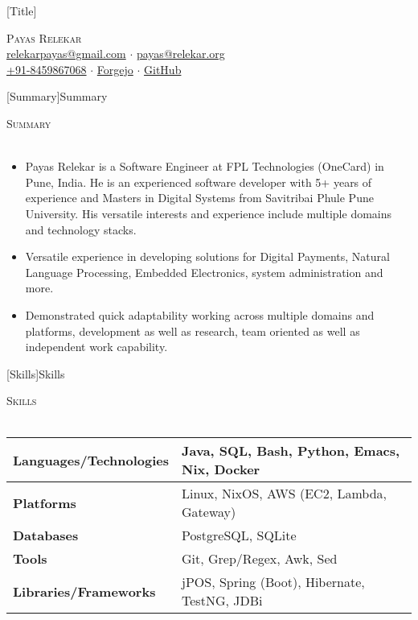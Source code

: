 \documentclass[a4paper]{article}
\newcommand{\lineunder} {
    \vspace*{-8pt} \\
    \hspace*{-18pt} \hrulefill \\
}
\newcommand{\header} [1] {
    {\hspace*{-18pt}\vspace*{6pt} \textsc{#1}}
    \vspace*{-6pt} \lineunder
}
\begin{document}
\vspace*{-40pt}

\vspace*{-10pt}
[Title]{}
\begin{center}
	{\Huge \scshape {Payas Relekar}}\\
	\href{mailto:relekarpayas@gmail.com}{relekarpayas@gmail.com} $\cdot$ \href{mailto:payas@relekar.org}{payas@relekar.org} \\
	\href{tel:+91-8459867068}{+91-8459867068} $\cdot$ \href{https://git.bhankas.org/payas/}{Forgejo} $\cdot$ \href{https://github.com/bhankas/}{GitHub}\\
\end{center}

[Summary]{Summary}
\header{Summary}
\vspace{1mm}

\begin{itemize} \itemsep 1pt
	\item Payas Relekar is a Software Engineer at FPL Technologies (OneCard) in Pune, India. He is an experienced software developer with 5+ years of experience and Masters in Digital Systems from Savitribai Phule Pune University. His versatile interests and experience include multiple domains and technology stacks.
	\item Versatile experience in developing solutions for Digital Payments, Natural Language Processing, Embedded Electronics, system administration and more.
	\item Demonstrated quick adaptability working across multiple domains and platforms, development as well as research, team oriented as well as independent work capability.
\end{itemize}

[Skills]{Skills}
\header{Skills}
\vspace{1mm}
\bgroup
\setlength{\arrayrulewidth}{0.2mm}
\def\arraystretch{1.2}
\begin{tabularx}{\textwidth}{ | X | X | }
	\hline
	\textbf{Languages/Technologies} & Java, SQL, Bash, Python, Emacs, Nix, Docker  \\
	\hline
	\textbf{Platforms}              & Linux, NixOS, AWS (EC2, Lambda, Gateway)     \\
	\hline
	\textbf{Databases}              & PostgreSQL, SQLite                           \\
	\hline
	\textbf{Tools}                  & Git, Grep/Regex, Awk, Sed                    \\
	\hline
	\textbf{Libraries/Frameworks}   & jPOS, Spring (Boot), Hibernate, TestNG, JDBi \\
	\hline
\end{tabularx}
\egroup
\vspace{2mm}
\end{document}
